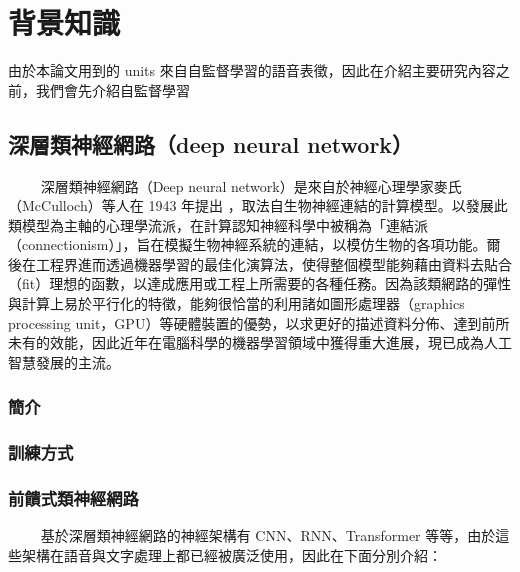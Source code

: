 

\chapter{背景知識}

由於本論文用到的 units 來自自監督學習的語音表徵，因此在介紹主要研究內容之前，我們會先介紹自監督學習 

\section{深層類神經網路（deep neural network）}

　　
深層類神經網路（Deep neural network）是來自於神經心理學家麥氏（McCulloch）等人在 1943 年提出 \cite{mcculloch1943logical}，取法自生物神經連結的計算模型。以發展此類模型為主軸的心理學流派，在計算認知神經科學中被稱為「連結派（connectionism）」，旨在模擬生物神經系統的連結，以模仿生物的各項功能。爾後在工程界進而透過機器學習的最佳化演算法，使得整個模型能夠藉由資料去貼合（fit）理想的函數，以達成應用或工程上所需要的各種任務。因為該類網路的彈性與計算上易於平行化的特徵，能夠很恰當的利用諸如圖形處理器（graphics processing unit，GPU）等硬體裝置的優勢，以求更好的描述資料分佈、達到前所未有的效能，因此近年在電腦科學的機器學習領域中獲得重大進展，現已成為人工智慧發展的主流。



\subsection{簡介}

\subsection{訓練方式}

\subsection{前饋式類神經網路}　　
基於深層類神經網路的神經架構有 CNN、RNN、Transformer 等等，由於這些架構在語音與文字處理上都已經被廣泛使用，因此在下面分別介紹：

